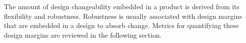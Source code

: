 The amount of design changeability embedded in a product is derived from its flexibility and robustness. Robustness is usually associated with design margins that are embedded in a design to absorb change. Metrics for quantifying these design margins are reviewed in the following section.





\newcommand{\changeCW}{0.55cm}
\newcommand{\mycontCW}{1.5cm}

